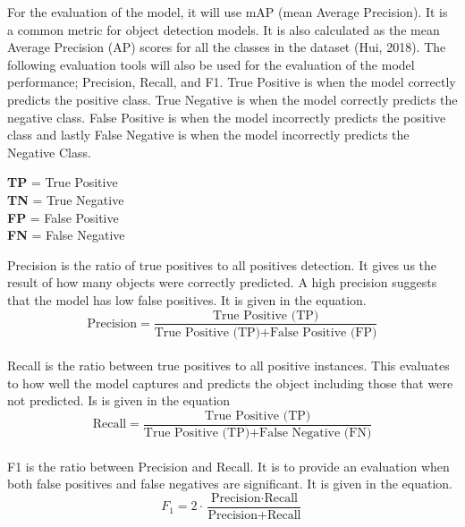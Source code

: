 For the evaluation of the model, it will use mAP (mean Average Precision). It is a common metric for object detection models. It is also calculated as the mean Average Precision (AP) scores for all the classes in the dataset (Hui, 2018). The following evaluation tools will also be used for the evaluation of the model performance; Precision, Recall, and F1. True Positive is when the model correctly predicts the positive class. True Negative is when the model correctly predicts the negative class. False Positive is when the model incorrectly predicts the positive class and lastly False Negative is when the model incorrectly predicts the Negative Class.
\begin{center}
    \textbf{TP} = True Positive \\
    \textbf{TN} = True Negative \\
    \textbf{FP} = False Positive \\
    \textbf{FN} = False Negative
\end{center}

\noindent Precision is the ratio of true positives to all positives detection. It gives us the result of how many objects were correctly predicted. A high precision suggests that the model has low false positives. It is given in the equation. \\

\begin{equation}
\text{Precision} = \frac{\text{True Positive (TP)}}{\text{True Positive (TP)} + \text{False Positive (FP)}}
\end{equation}\\

\noindent Recall is the ratio between true positives to all positive instances. This evaluates to how well the model captures and predicts the object including those that were not predicted. Is is given in the equation\\

\begin{equation}
\text{Recall} = \frac{\text{True Positive (TP)}}{\text{True Positive (TP)} + \text{False Negative (FN)}}
\end{equation}\\

\noindent F1 is the ratio between Precision and Recall. It is to provide an evaluation when both false positives and false negatives are significant. It is given in the equation.
\begin{equation}
F_1 = 2 \cdot \frac{\text{Precision} \cdot \text{Recall}}{\text{Precision} + \text{Recall}}
\end{equation}\\


